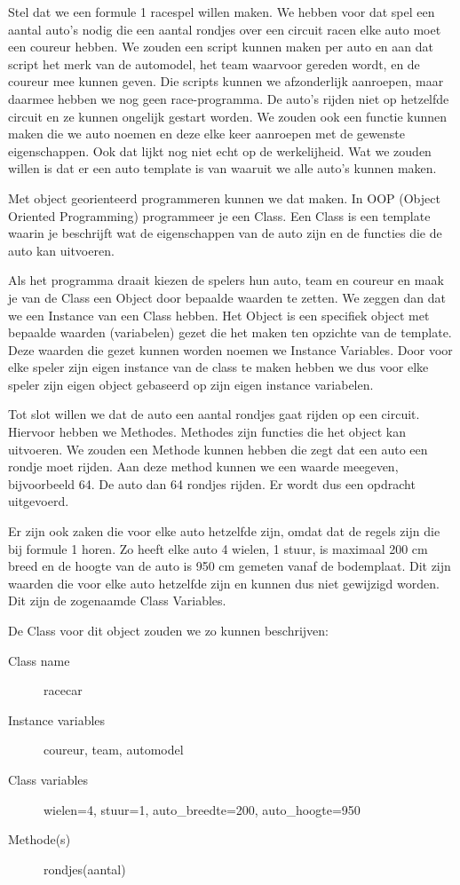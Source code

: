 Stel dat we een formule 1 racespel willen maken. We hebben voor dat spel een aantal auto's nodig die een aantal rondjes over een circuit racen elke auto moet een coureur hebben. We zouden een script kunnen maken per auto en aan dat script het merk van de automodel, het team waarvoor gereden wordt, en de coureur mee kunnen geven. Die scripts kunnen we afzonderlijk aanroepen, maar daarmee hebben we nog geen race-programma. De auto's rijden niet op hetzelfde circuit en ze kunnen ongelijk gestart worden. We zouden ook een functie kunnen maken die we auto noemen en deze elke keer aanroepen met de gewenste eigenschappen. Ook dat lijkt nog niet echt op de werkelijheid. Wat we zouden willen is dat er een auto template is van waaruit we alle auto's kunnen maken.

Met object georienteerd programmeren kunnen we dat maken. In OOP (Object Oriented Programming) programmeer je een Class. Een Class is een template waarin je beschrijft wat de eigenschappen van de auto zijn en de functies die de auto kan uitvoeren.

Als het programma draait kiezen de spelers hun auto, team en coureur en maak je van de Class een Object door bepaalde waarden te zetten. We zeggen dan dat we een Instance van een Class hebben. Het Object is een specifiek object met bepaalde waarden (variabelen) gezet die het  maken ten opzichte van de template. Deze waarden die gezet kunnen worden noemen we Instance Variables. Door voor elke speler zijn eigen instance van de class te maken hebben we dus voor elke speler zijn eigen object gebaseerd op zijn eigen instance variabelen.

Tot slot willen we dat de auto een aantal rondjes gaat rijden op een circuit. Hiervoor hebben we Methodes. Methodes zijn functies die het object kan uitvoeren. We zouden een Methode kunnen hebben die zegt dat een auto een rondje moet rijden. Aan deze method kunnen we een waarde meegeven, bijvoorbeeld 64. De auto dan 64 rondjes rijden. Er wordt dus een opdracht uitgevoerd.

Er zijn ook zaken die voor elke auto hetzelfde zijn, omdat dat de regels zijn die bij formule 1 horen. Zo heeft elke auto 4 wielen, 1 stuur, is maximaal 200 cm breed en de hoogte van de auto is 950 cm gemeten vanaf de bodemplaat. Dit zijn waarden die voor elke auto hetzelfde zijn en kunnen dus niet gewijzigd worden. Dit zijn de zogenaamde Class Variables.

De Class voor dit object zouden we zo kunnen beschrijven:
\begin{description}
\item[Class name] racecar
\item[Instance variables] coureur, team, automodel
\item[Class variables] wielen=4, stuur=1, auto\_breedte=200, auto\_hoogte=950
\item[Methode(s)] rondjes(aantal)
\end{description}

